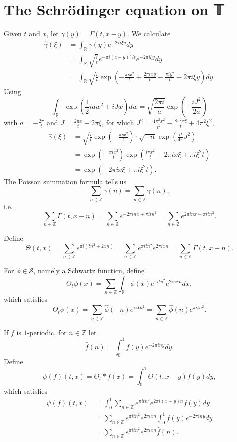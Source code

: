\documentclass{article}
\theoremstyle{definition}
\begin{document}
\section{The Schrödinger equation on 𝕋}
Given $t$ and $x$, let $\gamma(y) = \Gamma(t,x-y)$. We calculate
\begin{align*}
\widehat{\gamma}(\xi)&=\int_{\mathbb{R}} \gamma(y) e^{-2\pi i\xi y} dy\\
&=\int_{\mathbb{R}} \sqrt{\frac{i}{t}}  e^{-\pi i(x-y)^2/t}e^{-2\pi i\xi y} dy\\
&=\int_{\mathbb{R}} \sqrt{\frac{i}{t}}  \exp\left( -\frac{\pi ix^2}{t} + \frac{2\pi ixy}{t} - \frac{\pi iy^2}{t} - 2\pi i\xi y\right) dy.
\end{align*}
Using
\[
\int_{\mathbb{R}} \exp\left(\frac{1}{2}iaw^2 + iJw\right) dw = \sqrt{ \frac{2\pi i}{a}} \exp\left(-\frac{iJ^2}{2a}\right)
\]
with $a=-\frac{2\pi}{t}$ and $J=\frac{2\pi x}{t}-2\pi \xi$, for which $J^2 = \frac{4\pi^2 x^2}{t^2} - \frac{8\pi^2 x\xi}{t} + 4\pi^2 \xi^2$,
\begin{align*}
\widehat{\gamma}(\xi)&=\sqrt{\frac{i}{t}} \exp\left(-\frac{\pi ix^2}{t} \right) \cdot \sqrt{-it} \exp\left( \frac{it}{4\pi} J^2 \right)\\
&=  \exp\left(-\frac{\pi ix^2}{t} \right)  \exp\left( \frac{i\pi x^2}{t} - 2\pi i x\xi + \pi i \xi^2 t \right)\\
&=\exp\left(-2\pi ix\xi + \pi i\xi^2 t \right).
\end{align*}
The Poisson summation formula tells us
\[
\sum_{n \in \mathbb{Z}} \gamma(n) = \sum_{n \in \mathbb{Z}} \widehat{\gamma}(n),
\]
i.e.
\[
\sum_{n \in \mathbb{Z}}  \Gamma(t,x-n) = \sum_{n \in \mathbb{Z}} e^{-2\pi inx + \pi itn^2} = \sum_{n \in \mathbb{Z}} e^{2\pi inx
+\pi itn^2}.
\]


Define
\[
\Theta(t,x) =  \sum_{n \in \mathbb{Z}} e^{\pi i(tn^2+2xn)} = \sum_{n \in \mathbb{Z}} e^{\pi itn^2} e^{2\pi ixn}
=\sum_{n \in \mathbb{Z}}  \Gamma(t,x-n).
\]

For $\phi \in \mathscr{S}$, namely a Schwartz function,
define
\[
\Theta_t \phi(x) = \sum_{n \in \mathbb{Z}} \int_{\mathbb{R}} \phi(x)  e^{\pi itn^2} e^{2\pi ixn} dx,
\]
which satisfies
\[
\Theta_t \phi(x) = \sum_{n \in \mathbb{Z}} \widehat{\phi}(-n) e^{\pi itn^2} = \sum_{n \in \mathbb{Z}} \widehat{\phi}(n) e^{\pi itn^2}.
\]

If $f$ is $1$-periodic, for $n \in \mathbb{Z}$ let
\[
\widehat{f}(n) = \int_0^1 f(y) e^{-2\pi iny} dy.
\]
Define
\[
\psi(f)(t,x)=\Theta_t * f(x) = \int_0^1 \Theta(t,x-y) f(y) dy,
\]
which satisfies
\begin{align*}
\psi(f)(t,x)&=\int_0^1  \sum_{n \in \mathbb{Z}} e^{\pi itn^2} e^{2\pi i(x-y)n} f(y) dy\\
&=\sum_{n \in \mathbb{Z}} e^{\pi itn^2} e^{2\pi ixn} \int_0^1 f(y) e^{-2\pi iny} dy\\
&=\sum_{n \in \mathbb{Z}} e^{\pi itn^2} e^{2\pi ixn} \widehat{f}(n).
\end{align*}
\end{document}
